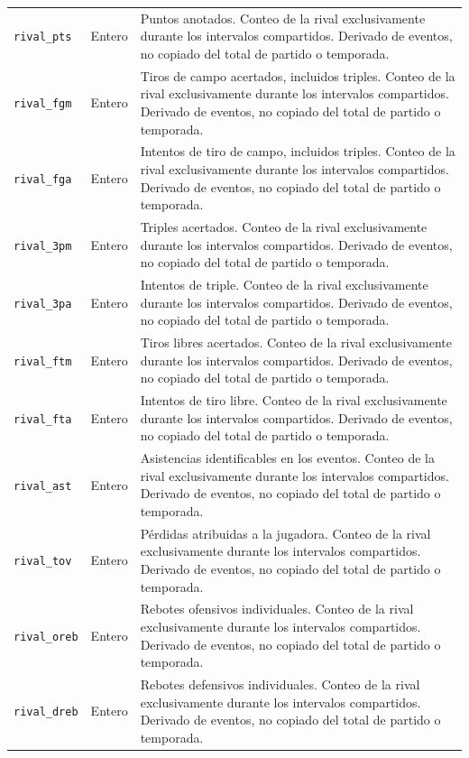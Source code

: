 \begin{longtable}{@{}>{\raggedright\arraybackslash}p{5.0cm}>{\raggedright\arraybackslash}p{1.9cm}>{\raggedright\arraybackslash}p{7.7cm}@{}}
\texttt{rival\_\allowbreak pts} & Entero & Puntos anotados. Conteo de la rival exclusivamente durante los intervalos compartidos. Derivado de eventos, no copiado del total de partido o temporada.\\
\texttt{rival\_\allowbreak fgm} & Entero & Tiros de campo acertados, incluidos triples. Conteo de la rival exclusivamente durante los intervalos compartidos. Derivado de eventos, no copiado del total de partido o temporada.\\
\texttt{rival\_\allowbreak fga} & Entero & Intentos de tiro de campo, incluidos triples. Conteo de la rival exclusivamente durante los intervalos compartidos. Derivado de eventos, no copiado del total de partido o temporada.\\
\texttt{rival\_\allowbreak 3pm} & Entero & Triples acertados. Conteo de la rival exclusivamente durante los intervalos compartidos. Derivado de eventos, no copiado del total de partido o temporada.\\
\texttt{rival\_\allowbreak 3pa} & Entero & Intentos de triple. Conteo de la rival exclusivamente durante los intervalos compartidos. Derivado de eventos, no copiado del total de partido o temporada.\\
\texttt{rival\_\allowbreak ftm} & Entero & Tiros libres acertados. Conteo de la rival exclusivamente durante los intervalos compartidos. Derivado de eventos, no copiado del total de partido o temporada.\\
\texttt{rival\_\allowbreak fta} & Entero & Intentos de tiro libre. Conteo de la rival exclusivamente durante los intervalos compartidos. Derivado de eventos, no copiado del total de partido o temporada.\\
\texttt{rival\_\allowbreak ast} & Entero & Asistencias identificables en los eventos. Conteo de la rival exclusivamente durante los intervalos compartidos. Derivado de eventos, no copiado del total de partido o temporada.\\
\texttt{rival\_\allowbreak tov} & Entero & Pérdidas atribuidas a la jugadora. Conteo de la rival exclusivamente durante los intervalos compartidos. Derivado de eventos, no copiado del total de partido o temporada.\\
\texttt{rival\_\allowbreak oreb} & Entero & Rebotes ofensivos individuales. Conteo de la rival exclusivamente durante los intervalos compartidos. Derivado de eventos, no copiado del total de partido o temporada.\\
\texttt{rival\_\allowbreak dreb} & Entero & Rebotes defensivos individuales. Conteo de la rival exclusivamente durante los intervalos compartidos. Derivado de eventos, no copiado del total de partido o temporada.\\

\end{longtable}
